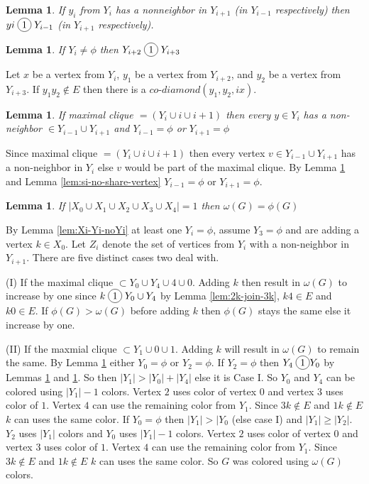 \documentclass[12pt]{article}
\newcommand*\circled[1]{\tikz[baseline=(char.base)]{
            \node[shape=circle,draw,inner sep=2pt] (char) {#1};}}
\newtheorem{Lemma}[Theorem]{Lemma}
\begin{document}
{\begin{Lemma}\label{lem:yi-miss-two-neighbors}
If $y_i$ from $Y_i$ has a nonneighbor in $Y_{i+1}$ (in $Y_{i-1}$ respectively) then $yi \;\circled{1}\; Y_{i-1}$ (in $Y_{i+1}$ respectively).
\end{Lemma}

\begin{Lemma}\label{lem:yi-force-join}
If $Y_i \neq \phi$ then $Y_{i+2} \;\circled{1}\; Y_{i+3}$
\end{Lemma}
 Let $x$ be a vertex from $Y_i$, $y_1$ be a vertex from $Y_{i+2}$, and $y_2$ be a vertex from $Y_{i+3}$. If $y_1y_2\not\in E$ then there is a $co$-$diamond (y_1, y_2, ix)$. 

\begin{Lemma}\label{lem:max-clique-yi}
If maximal clique $ = (Y_i \cup i \cup i+1)$ then every $y \in Y_i$ has a non-neighbor $\in Y_{i-1} \cup Y_{i+1}$ and $Y_{i-1} = \phi$ or $Y_{i+1} = \phi$
\end{Lemma}
 Since maximal clique $ = (Y_i \cup i \cup i+1)$ then every vertex $v \in Y_{i-1} \cup Y_{i+1}$ has a non-neighbor in $Y_i$ else $v$ would be part of the maximal clique. By Lemma \ref{lem:yi-miss-two-neighbors} and Lemma \ref{lem:si-no-share-vertex} $Y_{i-1} = \phi$ or $Y_{i+1} = \phi$.

\begin{Lemma}\label{lem:add-2vertex}
If $|X_0 \cup X_1 \cup X_2 \cup X_3 \cup X_4| = 1$ then $\omega(G) =  \phi(G)$
\end{Lemma}
 By Lemma \ref{lem:Xi-Yi-noYi} at least one $Y_i = \phi$, assume $Y_3 = \phi$ and are adding a vertex $k \in X_0$. Let $Z_i$ denote the set of vertices from $Y_i$ with a non-neighbor in $Y_{i+1}$. There are five distinct cases two deal with.

(I) If the maximal clique $\subset Y_0 \cup Y_4 \cup 4 \cup 0$. Adding $k$ then result in $\omega(G)$ to increase by one since $k \;\circled{1}\; Y_0 \cup Y_4$ by Lemma \ref{lem:2k-join-3k}, $k4 \in E$ and $k0 \in E$. If $\phi(G) > \omega(G)$ before adding $k$ then $\phi(G)$ stays the same else it increase by one.

(II) If the maxmial clique $\subset Y_1 \cup 0 \cup 1$. Adding $k$ will result in $\omega(G)$ to remain the same. By Lemma \ref{lem:max-clique-yi} either $Y_0 = \phi$ or $Y_2 = \phi$. If $Y_2 = \phi$ then $Y_4 \;\circled{1} Y_0$ by Lemmas \ref{lem:max-clique-yi} and \ref{lem:yi-miss-two-neighbors}. So then $|Y_1| > |Y_0| + |Y_4|$ else it is Case I. So $Y_0$ and $Y_4$ can be colored using $|Y_1| - 1$ colors. Vertex $2$ uses color of vertex $0$ and vertex $3$ uses color of $1$. Vertex $4$ can use the remaining color from $Y_1$. Since $3k \not \in E$ and $1k \not \in E$ $k$ can uses the same color. If $Y_0 = \phi$ then $|Y_1| > |Y_0$ (else case I) and $|Y_1| \geq |Y_2|$. $Y_2$ uses $|Y_1|$ colors and $Y_0$ uses $|Y_1| - 1$ colors. Vertex $2$ uses color of vertex $0$ and vertex $3$ uses color of $1$. Vertex $4$ can use the remaining color from $Y_1$. Since $3k \not \in E$ and $1k \not \in E$ $k$ can uses the same color. So $G$ was colored using $\omega(G)$ colors.

}
\end{document}
